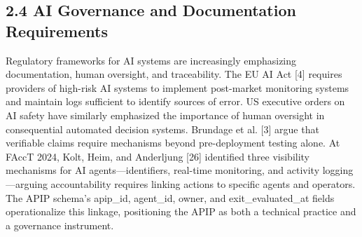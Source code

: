 \subsection{2.4  AI Governance and Documentation Requirements}

Regulatory frameworks for AI systems are increasingly emphasizing documentation, human oversight, and traceability. The EU AI Act [4] requires providers of high-risk AI systems to implement post-market monitoring systems and maintain logs sufficient to identify sources of error. US executive orders on AI safety have similarly emphasized the importance of human oversight in consequential automated decision systems. Brundage et al. [3] argue that verifiable claims require mechanisms beyond pre-deployment testing alone. At FAccT 2024, Kolt, Heim, and Anderljung [26] identified three visibility mechanisms for AI agents---identifiers, real-time monitoring, and activity logging---arguing accountability requires linking actions to specific agents and operators. The APIP schema's apip\_id, agent\_id, owner, and exit\_evaluated\_at fields operationalize this linkage, positioning the APIP as both a technical practice and a governance instrument.


